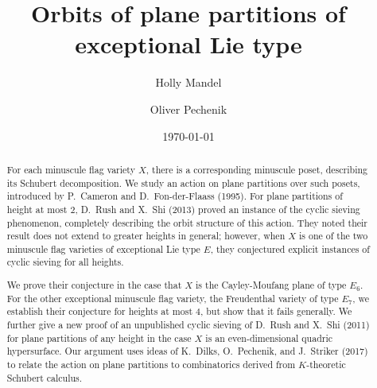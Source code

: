 \documentclass[12pt]{amsart}
\theoremstyle{definition}
\theoremstyle{remark}
\numberwithin{equation}{section}
\begin{document}

\title[Orbits of plane partitions]{Orbits of plane partitions of exceptional Lie type}  

\author[H. Mandel]{Holly Mandel}
\address[HM]{Department of Mathematics, University of California, Berkeley, \linebreak Berkeley, CA 94720}

\author[O. Pechenik]{Oliver Pechenik}
\address[OP]{Department of Mathematics, University of Michigan, Ann Arbor, MI 48109}


\date{\today}




\begin{abstract}
For each minuscule flag variety $X$, there is a corresponding minuscule poset, describing its Schubert decomposition. We study an action on plane partitions over such posets, introduced by P.~Cameron and D.~Fon-der-Flaass (1995).
For plane partitions of height at most $2$, D.~Rush and X.~Shi (2013) proved an instance of the cyclic sieving phenomenon, completely describing the orbit structure of this action. They noted their result does not extend to greater heights in general; however, when $X$ is one of the two minuscule flag varieties of exceptional Lie type $E$, they conjectured explicit instances of cyclic sieving for all heights.

We prove their conjecture in the case that $X$ is the Cayley-Moufang plane of type $E_6$. For the other exceptional minuscule flag variety, the Freudenthal variety of type $E_7$, we establish their conjecture for heights at most $4$, but show that it fails generally. We further give a new proof of an unpublished cyclic sieving of D.~Rush and X.~Shi (2011) for plane partitions of any height in the case $X$ is an even-dimensional quadric hypersurface. 
Our argument uses ideas of K.~Dilks, O.~Pechenik, and J.~Striker (2017) to relate the action on plane partitions to combinatorics derived from $K$-theoretic Schubert calculus. 
\end{abstract}
\end{document}

